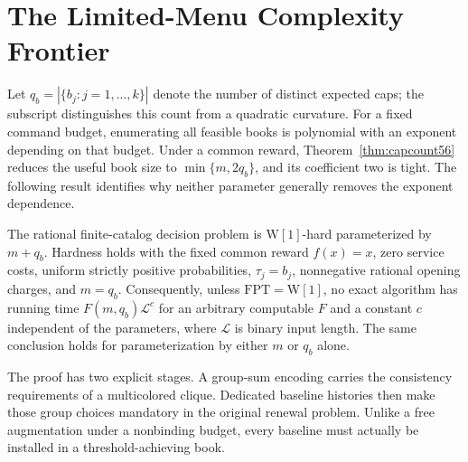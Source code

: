 \section{The Limited-Menu Complexity Frontier}\label{sec:param59}
Let $q_b=|\{b_j:j=1,\ldots,k\}|$ denote the number of distinct expected caps; the subscript distinguishes this count from a quadratic curvature. For a fixed command budget, enumerating all feasible books is polynomial with an exponent depending on that budget. Under a common reward, Theorem~\ref{thm:capcount56} reduces the useful book size to $\min\{m,2q_b\}$, and its coefficient two is tight. The following result identifies why neither parameter generally removes the exponent dependence.

\begin{theorem}\label{thm:wone59}
The rational finite-catalog decision problem is $\mathrm{W}[1]$-hard parameterized by $m+q_b$. Hardness holds with the fixed common reward $f(x)=x$, zero service costs, uniform strictly positive probabilities, $\tau_j=b_j$, nonnegative rational opening charges, and $m=q_b$. Consequently, unless $\mathrm{FPT}=\mathrm{W}[1]$, no exact algorithm has running time $F(m,q_b)\mathcal L^c$ for an arbitrary computable $F$ and a constant $c$ independent of the parameters, where $\mathcal L$ is binary input length. The same conclusion holds for parameterization by either $m$ or $q_b$ alone.
\end{theorem}

The proof has two explicit stages. A group-sum encoding carries the consistency requirements of a multicolored clique. Dedicated baseline histories then make those group choices mandatory in the original renewal problem. Unlike a free augmentation under a nonbinding budget, every baseline must actually be installed in a threshold-achieving book.

